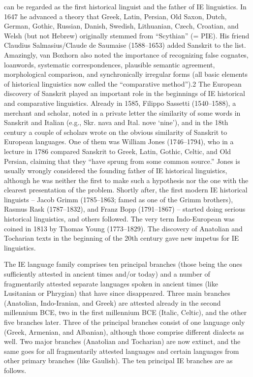 can be regarded as the first historical linguist and the father of IE linguistics. In 1647
he advanced a theory that Greek, Latin, Persian, Old Saxon, Dutch, German, Gothic,
Russian, Danish, Swedish, Lithuanian, Czech, Croatian, and Welsh (but not Hebrew)
originally stemmed from “Scythian” (= PIE). His friend Claudius Salmasius/Claude de
Saumaise (1588–1653) added Sanskrit to the list. Amazingly, van Boxhorn also noted
the importance of recognizing false cognates, loanwords, systematic correspondences,
plausible semantic agreement, morphological comparison, and synchronically irregular
forms (all basic elements of historical linguistics now called the “comparative method”).2
The European discovery of Sanskrit played an important role in the beginnings of IE
historical and comparative linguistics. Already in 1585, Filippo Sassetti (1540–1588), a
merchant and scholar, noted in a private letter the similarity of some words in Sanskrit
and Italian (e.g., Skr. nava and Ital. nove ‘nine’), and in the 18th century a couple of
scholars wrote on the obvious similarity of Sanskrit to European languages. One of them
was William Jones (1746–1794), who in a lecture in 1786 compared Sanskrit to Greek,
Latin, Gothic, Celtic, and Old Persian, claiming that they “have sprung from some common
source.” Jones is usually wrongly considered the founding father of IE historical
linguistics, although he was neither the first to make such a hypothesis nor the one with
the clearest presentation of the problem. Shortly after, the first modern IE historical
linguists – Jacob Grimm (1785–1863; famed as one of the Grimm brothers), Rasmus Rask
(1787–1832), and Franz Bopp (1791–1867) – started doing serious historical linguistics,
and others followed. The very term Indo-European was coined in 1813 by Thomas Young
(1773–1829). The discovery of Anatolian and Tocharian texts in the beginning of the 20th
century gave new impetus for IE linguistics.

The IE language family comprises ten principal branches (those being the ones sufficiently
attested in ancient times and/or today) and a number of fragmentarily attested
separate languages spoken in ancient times (like Lusitanian or Phrygian) that have since
disappeared. Three main branches (Anatolian, Indo-Iranian, and Greek) are attested
already in the second millennium BCE, two in the first millennium BCE (Italic, Celtic),
and the other five branches later. Three of the principal branches consist of one language
only (Greek, Armenian, and Albanian), although those comprise different dialects
as well. Two major branches (Anatolian and Tocharian) are now extinct, and the same
goes for all fragmentarily attested languages and certain languages from other primary
branches (like Gaulish). The ten principal IE branches are as follows.

